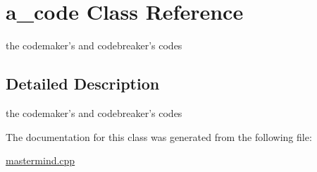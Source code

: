 \hypertarget{classa__code}{\section{a\-\_\-code Class Reference}
\label{classa__code}
}


the codemaker's and codebreaker's codes  




\subsection{Detailed Description}
the codemaker's and codebreaker's codes 

The documentation for this class was generated from the following file\-:\begin{DoxyCompactItemize}
\item 
\hyperlink{mastermind_8cpp}{mastermind.\-cpp}\end{DoxyCompactItemize}
